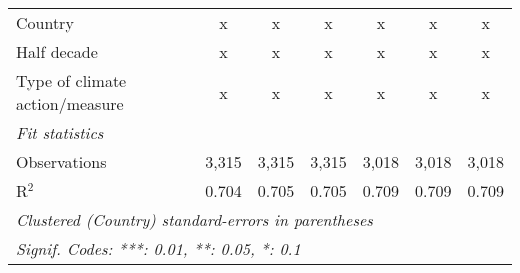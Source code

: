 \begin{tabular}{lcccccc}
   Country                                                  & x       & x             & x             & x             & x             & x\\  
   Half decade                                              & x       & x             & x             & x             & x             & x\\  
   Type of climate action/measure                           & x       & x             & x             & x             & x             & x\\  
   \midrule \emph{Fit statistics}\\
   Observations                                             & 3,315   & 3,315         & 3,315         & 3,018         & 3,018         & 3,018\\  
   R$^2$                                                    & 0.704   & 0.705         & 0.705         & 0.709         & 0.709         & 0.709\\  
   \midrule
   \multicolumn{7}{l}{\emph{Clustered (Country) standard-errors in parentheses}}\\
   \multicolumn{7}{l}{\emph{Signif. Codes: ***: 0.01, **: 0.05, *: 0.1}}\\
\end{tabular}
\par\endgroup


